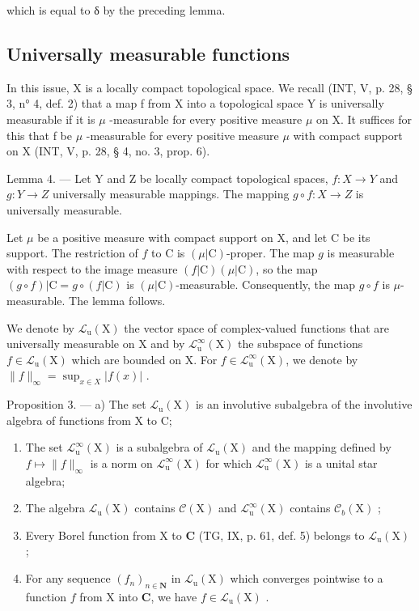 which is equal to δ by the preceding lemma.

\subsection{Universally measurable functions}

In this issue, X is a locally compact topological space. We recall (INT, V, p. 28, § 3, n° 4, def. 2) that a map f from X into a topological space Y is universally measurable if it is \(\mu\) -measurable for every positive measure \(\mu\) on X. It suffices for this that f be \(\mu\) -measurable for every positive measure \(\mu\) with compact support on X (INT, V, p. 28, § 4, no. 3, prop. 6).

Lemma 4. --- Let Y and Z be locally compact topological spaces, \(f\colon X\to Y\) and \(g\colon Y\to Z\) universally measurable mappings. The mapping \(g\circ f\colon X\to Z\) is universally measurable.

Let \(\mu\) be a positive measure with compact support on X, and let C be its support. The restriction of \(f\) to C is \((\mu|\mathrm{C})\)-proper. The map \(g\) is measurable with respect to the image measure \((f|\mathrm{C})(\mu|\mathrm{C})\), so the map \((g \circ f)|\mathrm{C} = g \circ (f|\mathrm{C})\) is \((\mu|\mathrm{C})\)-measurable. Consequently, the map \(g \circ f\) is \(\mu\)-measurable. The lemma follows.

We denote by \(\mathcal{L}_{\mathrm{u}}(\mathrm{X})\) the vector space of complex-valued functions that are universally measurable on X and by \(\mathcal{L}_{\mathrm{u}}^{\infty}(\mathrm{X})\) the subspace of functions \(f \in \mathcal{L}_{\mathrm{u}}(\mathrm{X})\) which are bounded on X. For \(f \in \mathcal{L}_{\mathrm{u}}^{\infty}(\mathrm{X})\), we denote by \(\|f\|_{\infty} = \sup_{x \in X} |f(x)|\) .

Proposition 3. --- a) The set \(\mathcal{L}_{\mathrm{u}}(\mathrm{X})\) is an involutive subalgebra of the involutive algebra of functions from X to C;

\begin{enumerate}
\def\labelenumi{\alph{enumi})}
\setcounter{enumi}{1}
\item
  The set \(\mathcal{L}_{\mathrm{u}}^{\infty}(\mathrm{X})\) is a subalgebra of \(\mathcal{L}_{\mathrm{u}}(\mathrm{X})\) and the mapping defined by \(f\mapsto \| f\|_{\infty}\) is a norm on \(\mathcal{L}_{\mathrm{u}}^{\infty}(\mathrm{X})\) for which \(\mathcal{L}_{\mathrm{u}}^{\infty}(\mathrm{X})\) is a unital star algebra;
\item
  The algebra \(\mathcal{L}_{\mathrm{u}}(\mathrm{X})\) contains \(\mathcal{C}(\mathrm{X})\) and \(\mathcal{L}_{\mathrm{u}}^{\infty}(\mathrm{X})\) contains \(\mathcal{C}_b(\mathrm{X})\) ;
\item
  Every Borel function from X to \(\mathbf{C}\) (TG, IX, p. 61, def. 5) belongs to \(\mathcal{L}_{\mathrm{u}}(\mathrm{X})\) ;
\item
  For any sequence \((f_n)_{n\in \mathbf{N}}\) in \(\mathcal{L}_{\mathrm{u}}(\mathrm{X})\) which converges pointwise to a function \(f\) from X into \(\mathbf{C}\), we have \(f\in \mathcal{L}_{\mathrm{u}}(\mathrm{X})\) .
\end{enumerate}

